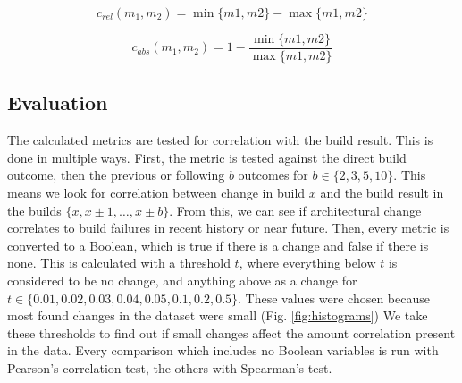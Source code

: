 \documentclass[sigplan, anonymous, review]{acmart}
\begin{document}
\begin{equation} \label{eq:relDiff}
c_{rel}(m_1, m_2) =  \min\{m1, m2\} - \max\{m1, m2\}
\end{equation} 

\begin{equation} \label{eq:absDiff}
	c_{abs}(m_1, m_2) = 1 - \frac{\min\{m1, m2\}}{\max\{m1, m2\}}
\end{equation} 

\subsection{Evaluation}

The calculated metrics are tested for correlation with the build result. This is done in multiple ways. First, the metric is tested against the direct build outcome, then the previous or following $b$ outcomes for $b \in \{2, 3, 5, 10\}$. This means we look for correlation between change in build $x$ and the build result in the builds $\{x, x \pm 1, \hdots, x \pm b\}$. From this, we can see if architectural change correlates to build failures in recent history or near future. 
Then, every metric is converted to a Boolean, which is true if there is a change and false if there is none. This is calculated with a threshold $t$, where everything below $t$ is considered to be no change, and anything above as a change for $t \in \{0.01, 0.02, 0.03, 0.04, 0.05, 0.1, 0.2, 0.5\}$. These values were chosen because most found changes in the dataset were small (Fig. \ref{fig:histograms}) We take these thresholds to find out if small changes affect the amount correlation present in the data. Every comparison which includes no Boolean variables is run with Pearson's correlation test, the others with Spearman's test. 
\end{document}

